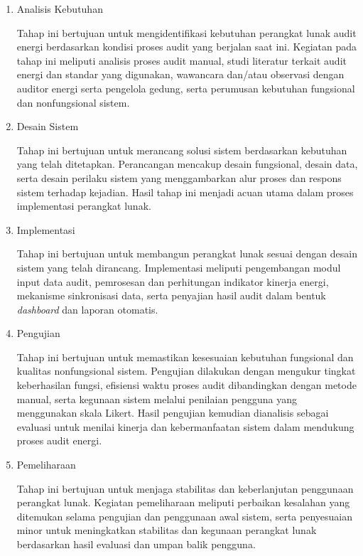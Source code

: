 \begin{enumerate}
    \item Analisis Kebutuhan
    
    Tahap ini bertujuan untuk mengidentifikasi kebutuhan perangkat lunak audit energi berdasarkan kondisi proses audit yang berjalan saat ini. Kegiatan pada tahap ini meliputi analisis proses audit manual, studi literatur terkait audit energi dan standar yang digunakan, wawancara dan/atau observasi dengan auditor energi serta pengelola gedung, serta perumusan kebutuhan fungsional dan nonfungsional sistem.

    \vspace{.1cm}
    \item Desain Sistem
    
    Tahap ini bertujuan untuk merancang solusi sistem berdasarkan kebutuhan yang telah ditetapkan. Perancangan mencakup desain fungsional, desain data, serta desain perilaku sistem yang menggambarkan alur proses dan respons sistem terhadap kejadian. Hasil tahap ini menjadi acuan utama dalam proses implementasi perangkat lunak.
    
    \vspace{.1cm}
    \item Implementasi
    
    Tahap ini bertujuan untuk membangun perangkat lunak sesuai dengan desain sistem yang telah dirancang. Implementasi meliputi pengembangan modul input data audit, pemrosesan dan perhitungan indikator kinerja energi, mekanisme sinkronisasi data, serta penyajian hasil audit dalam bentuk \textit{dashboard} dan laporan otomatis.
    
    \vspace{.1cm}
    \item Pengujian

    Tahap ini bertujuan untuk memastikan kesesuaian kebutuhan fungsional dan kualitas nonfungsional sistem. Pengujian dilakukan dengan mengukur tingkat keberhasilan fungsi, efisiensi waktu proses audit dibandingkan dengan metode manual, serta kegunaan sistem melalui penilaian pengguna yang menggunakan skala Likert. Hasil pengujian kemudian dianalisis sebagai evaluasi untuk menilai kinerja dan kebermanfaatan sistem dalam mendukung proses audit energi.
    
    \vspace{.1cm}
    \item Pemeliharaan
    
    Tahap ini bertujuan untuk menjaga stabilitas dan keberlanjutan penggunaan perangkat lunak. Kegiatan pemeliharaan meliputi perbaikan kesalahan yang ditemukan selama pengujian dan penggunaan awal sistem, serta penyesuaian minor untuk meningkatkan stabilitas dan kegunaan perangkat lunak berdasarkan hasil evaluasi dan umpan balik pengguna.
\end{enumerate}

